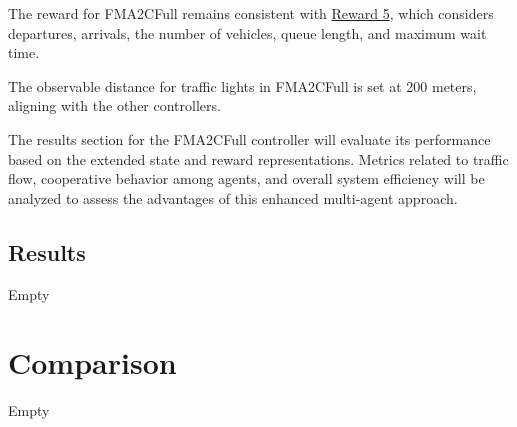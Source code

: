 The reward for FMA2CFull remains consistent with \hyperref[subsec:reward-5]{Reward 5}, which considers departures, arrivals, the number of vehicles, queue length, and maximum wait time.

The observable distance for traffic lights in FMA2CFull is set at 200 meters, aligning with the other controllers.

The results section for the FMA2CFull controller will evaluate its performance based on the extended state and reward representations. Metrics related to traffic flow, cooperative behavior among agents, and overall system efficiency will be analyzed to assess the advantages of this enhanced multi-agent approach.

\subsection{Results}
Empty

\section{Comparison}
Empty